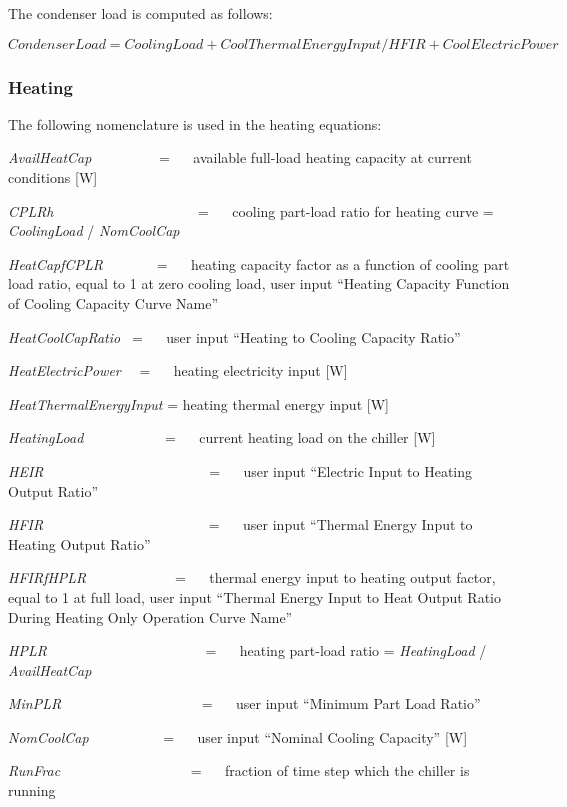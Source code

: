 The condenser load is computed as follows:

\begin{equation}
CondenserLoad = CoolingLoad + CoolThermalEnergyInput/HFIR + CoolElectricPower
\end{equation}

\subsubsection{Heating}\label{heating-1}

The following nomenclature is used in the heating equations:

\emph{AvailHeatCap}~~~~~~~~~ = ~~ available full-load heating capacity at current conditions {[}W{]}

\emph{CPLRh}~~~~~~~~~~~~~~~~~~~~ = ~~ cooling part-load ratio for heating curve = \emph{CoolingLoad} / \emph{NomCoolCap}

\emph{HeatCapfCPLR}~~~~~~~ = ~~ heating capacity factor as a function of cooling part load ratio, equal to 1 at zero cooling load, user input ``Heating Capacity Function of Cooling Capacity Curve Name''

\emph{HeatCoolCapRatio~} = ~~ user input ``Heating to Cooling Capacity Ratio''

\emph{HeatElectricPower}~~ = ~~ heating electricity input {[}W{]}

\emph{HeatThermalEnergyInput} = heating thermal energy input {[}W{]}

\emph{HeatingLoad}~~~~~~~~~~~ = ~~ current heating load on the chiller {[}W{]}

\emph{HEIR}~~~~~~~~~~~~~~~~~~~~~~~ = ~~ user input ``Electric Input to Heating Output Ratio''

\emph{HFIR}~~~~~~~~~~~~~~~~~~~~~~~ = ~~ user input ``Thermal Energy Input to Heating Output Ratio''

\emph{HFIRfHPLR}~~~~~~~~~~~~ = ~~ thermal energy input to heating output factor, equal to 1 at full load, user input ``Thermal Energy Input to Heat Output Ratio During Heating Only Operation Curve Name''

\emph{HPLR}~~~~~~~~~~~~~~~~~~~~~~ = ~~ heating part-load ratio = \emph{HeatingLoad} / \emph{AvailHeatCap}

\emph{MinPLR~~~~~~~~~~~~~~~~~~~} = ~~ user input ``Minimum Part Load Ratio''

\emph{NomCoolCap}~~~~~~~~~~ = ~~ user input ``Nominal Cooling Capacity'' {[}W{]}

\emph{RunFrac}~~~~~~~~~~~~~~~~~~ = ~~ fraction of time step which the chiller is running

